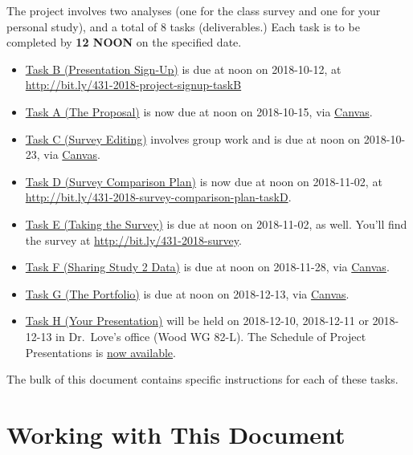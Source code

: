 \documentclass[]{book}
\providecommand{\tightlist}{%
  \setlength{\itemsep}{0pt}\setlength{\parskip}{0pt}}
\theoremstyle{definition}
\theoremstyle{definition}
\theoremstyle{definition}
\theoremstyle{remark}
\begin{document}
The project involves two analyses (one for the class survey and one for
your personal study), and a total of 8 tasks (deliverables.) Each task
is to be completed by \textbf{12 NOON} on the specified date.

\begin{itemize}
\tightlist
\item
  \protect\hyperlink{taskB}{Task B (Presentation Sign-Up)} is due at
  noon on 2018-10-12, at
  \url{http://bit.ly/431-2018-project-signup-taskB}
\item
  \protect\hyperlink{taskA}{Task A (The Proposal)} is now due at noon on
  2018-10-15, via \href{https://canvas.case.edu/}{Canvas}.
\item
  \protect\hyperlink{taskC}{Task C (Survey Editing)} involves group work
  and is due at noon on 2018-10-23, via
  \href{https://canvas.case.edu/}{Canvas}.
\item
  \protect\hyperlink{taskD}{Task D (Survey Comparison Plan)} is now due
  at noon on 2018-11-02, at
  \url{http://bit.ly/431-2018-survey-comparison-plan-taskD}.
\item
  \protect\hyperlink{taskE}{Task E (Taking the Survey)} is due at noon
  on 2018-11-02, as well. You'll find the survey at
  \url{http://bit.ly/431-2018-survey}.
\item
  \protect\hyperlink{taskF}{Task F (Sharing Study 2 Data)} is due at
  noon on 2018-11-28, via \href{https://canvas.case.edu/}{Canvas}.
\item
  \protect\hyperlink{taskG}{Task G (The Portfolio)} is due at noon on
  2018-12-13, via \href{https://canvas.case.edu/}{Canvas}.
\item
  \protect\hyperlink{taskH}{Task H (Your Presentation)} will be held on
  2018-12-10, 2018-12-11 or 2018-12-13 in Dr.~Love's office (Wood WG
  82-L). The Schedule of Project Presentations is
  \href{http://bit.ly/431-2018-project-schedule}{now available}.
\end{itemize}

The bulk of this document contains specific instructions for each of
these tasks.

\hypertarget{working-with-this-document}{%
\section*{Working with This Document}\label{working-with-this-document}}
\end{document}
